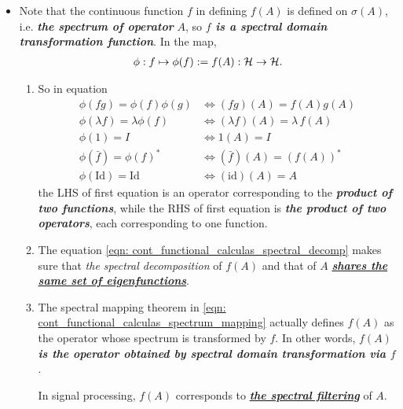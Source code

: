 \documentclass[11pt]{article}
\begin{document}
\begin{itemize}
\item \begin{remark}
Note that the continuous function $f$ in defining $f(A)$ is defined on $\sigma(A)$, i.e. \emph{\textbf{the spectrum of operator}} $A$, so \emph{\textbf{$f$ is a spectral domain transformation function}}.  In the map, 
\begin{align*}
\phi: f \mapsto \phi(f) := f(A): {\mathcal H} \rightarrow {\mathcal H}.
\end{align*} 
\begin{enumerate}
\item So in equation 
\begin{align*}
\phi(fg) = \phi(f)\phi(g) &\Leftrightarrow (fg)(A) = f(A)g(A)\\
\phi(\lambda f) = \lambda \phi(f) &\Leftrightarrow (\lambda f)(A) = \lambda\,f(A)\\
\phi(1) = I &\Leftrightarrow  1(A) = I \\
\phi(\bar{f}) =  \phi(f)^{*} &\Leftrightarrow  (\bar{f})(A) = (f(A))^{*} \\
\phi(\text{Id}) = \text{Id} &\Leftrightarrow (\text{id})(A) = A
\end{align*} the LHS of first equation is an operator corresponding to the \emph{\textbf{product of two functions}}, while the RHS of first equation is \emph{\textbf{the product of two operators}}, each corresponding to one function.

\item The equation \eqref{eqn: cont_functional_calculas_spectral_decomp} makes sure that \emph{the spectral decomposition} of $f(A)$ and that of $A$ \emph{\textbf{\underline{shares the same set of eigenfunctions}}}.

\item The spectral mapping theorem in \eqref{eqn: cont_functional_calculas_spectrum_mapping} actually defines $f(A)$ as the operator whose spectrum is transformed by $f$. In other words, \emph{\textbf{$f(A)$ is the operator obtained by spectral domain transformation via $f$}}. 

In signal processing, $f(A)$ corresponds to \underline{\emph{\textbf{the spectral filtering}}} of $A$.
\end{enumerate}
\end{remark}


\end{itemize}
\end{document}
